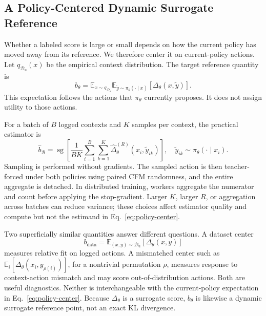 \documentclass[10pt]{article}
\newcommand{\sg}{\operatorname{sg}}
\newcommand{\E}{\mathbb{E}}
\newcommand{\Dunary}{\mathcal{D}_{\mathrm{u}}}
\begin{document}
\subsection{A Policy-Centered Dynamic Surrogate Reference}

Whether a labeled score is large or small depends on how the current policy has
moved away from its reference. We therefore center it on current-policy actions.
Let $q_{\Dunary}(x)$ be the empirical context distribution. The target reference
quantity is
\begin{equation}
    b_\theta
    =\E_{x\sim q_{\Dunary}}
       \E_{\widetilde{y}\sim\pi_\theta(\cdot\mid x)}
       \left[\Delta_\theta(x,\widetilde{y})\right].
    \label{eq:policy-center}
\end{equation}
This expectation follows the actions that $\pi_\theta$ currently proposes. It
does not assign utility to those actions.

For a batch of $B$ logged contexts and $K$ samples per context, the practical
estimator is
\begin{equation}
    \widehat{b}_{\mathcal{B}}
    =\sg\!\left[
      \frac{1}{BK}\sum_{i=1}^{B}\sum_{k=1}^{K}
      \widehat{\Delta}^{(R)}_\theta
      \left(x_i,\widetilde{y}_{ik}\right)
      \right],
    \quad
    \widetilde{y}_{ik}\sim\pi_\theta(\cdot\mid x_i).
    \label{eq:bhat}
\end{equation}
Sampling is performed without gradients. The sampled action is then
teacher-forced under both policies using paired CFM randomness, and the entire
aggregate is detached. In distributed training, workers aggregate the numerator
and count before applying the stop-gradient. Larger $K$, larger $R$, or
aggregation across batches can reduce variance; these choices affect estimator
quality and compute but not the estimand in Eq.~\eqref{eq:policy-center}.

Two superficially similar quantities answer different questions. A dataset
center
\begin{equation}
    b_{\mathrm{data}}
    =\E_{(x,y)\sim\Dunary}\left[\Delta_\theta(x,y)\right]
\end{equation}
measures relative fit on logged actions. A mismatched center such as
$\E_i[\Delta_\theta(x_i,y_{\rho(i)})]$, for a nontrivial permutation $\rho$,
measures response to context-action mismatch and may score out-of-distribution
actions. Both are useful diagnostics. Neither is interchangeable with the
current-policy expectation in Eq.~\eqref{eq:policy-center}. Because
$\Delta_\theta$ is a surrogate score, $b_\theta$ is likewise a dynamic
surrogate reference point, not an exact KL divergence.
\end{document}
